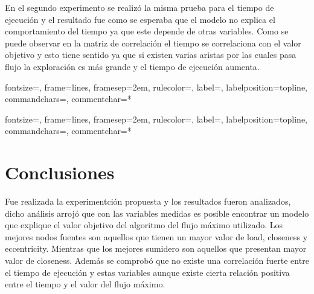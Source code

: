 \documentclass[a4paper, 11pt]{article}
\begin{document}
En el segundo experimento se realiz\'o la misma prueba para el tiempo de ejecuci\'on y el resultado fue como se esperaba que el modelo no explica el comportamiento del tiempo ya que este depende de otras variables. Como se puede observar en la matriz de correlaci\'on el tiempo se correlaciona con el valor objetivo y esto tiene sentido ya que si existen varias aristas por las cuales pasa flujo la exploraci\'on es m\'as grande y el tiempo de ejecuci\'on aumenta.


%
{fontsize=\footnotesize,
 frame=lines,  %
 framesep=2em, %
 rulecolor=\color{Gray},
 label=,
 labelposition=topline,
 commandchars=\|\(\), %
 commentchar=*        %
}

\newpage 

%
{fontsize=\footnotesize,
 frame=lines,  %
 framesep=2em, %
 rulecolor=\color{Gray},
 label=,
 labelposition=topline,
 commandchars=\|\(\), %
 commentchar=*        %
}
{}



\section{Conclusiones}

Fue realizada la experimentci\'on propuesta y los resultados fueron analizados, dicho an\'alisis arroj\'o que con las variables medidas es posible encontrar un modelo que explique el valor objetivo del algoritmo del flujo m\'aximo utilizado. Los mejores nodos fuentes son aquellos que tienen un mayor valor de load, closeness y eccentricity. Mientras que los mejores sumidero son aquellos que presentan mayor valor de closeness. Adem\'as se comprob\'o que no existe una correlaci\'on fuerte entre el tiempo de ejecuci\'on y estas variables aunque existe cierta relaci\'on positiva entre el tiempo y el valor del flujo m\'aximo.






\nocite{*}
\end{document}
